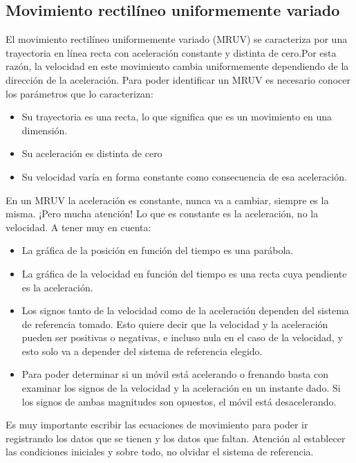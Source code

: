 \documentclass[a4paper,12pt,twoside]{book}
\begin{document}
    
\subsection{Movimiento rectilíneo uniformemente variado}

\begin{mdframed}[style=explicacion]
    El movimiento rectilíneo uniformemente variado (MRUV) se caracteriza por una trayectoria en línea recta con aceleración constante y distinta de cero.Por esta razón, la velocidad en este movimiento cambia uniformemente dependiendo de la dirección de la aceleración.
    Para poder identificar un MRUV es necesario conocer los parámetros que lo caracterizan:

    \begin{itemize}
        \item Su trayectoria es una recta, lo que significa que es un movimiento en una dimensión.
        \item Su aceleración es distinta de cero
        \item Su velocidad varía en forma constante como consecuencia de esa  aceleración. 
    \end{itemize}

    En un MRUV la aceleración es constante, nunca va a cambiar, siempre es la misma.
    ¡Pero mucha atención!
    Lo que es constante es la aceleración, no la velocidad.
    A tener muy en cuenta:

    \begin{itemize}
        \item La gráfica de la posición en función del tiempo es una parábola.
        \item La gráfica de la velocidad en función del tiempo es una recta cuya pendiente es la aceleración.
        \item Los signos tanto de la velocidad como de la aceleración dependen del sistema de referencia tomado. Esto quiere decir que la velocidad y la aceleración pueden ser positivas o negativas, e incluso nula en el caso de la velocidad, y esto solo va a depender del sistema de referencia elegido.
        \item Para poder determinar si un móvil está acelerando o frenando basta con examinar los signos de la velocidad y la aceleración en un instante dado. Si los signos de ambas magnitudes son opuestos, el móvil está desacelerando.
    \end{itemize}

    Es muy importante escribir las ecuaciones de movimiento para poder ir registrando los datos que se tienen y los datos que faltan. Atención al establecer las condiciones iniciales y sobre todo, no olvidar el sistema de referencia.
\end{mdframed}
\end{document}
